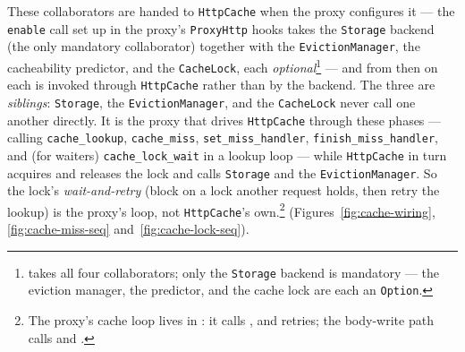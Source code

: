 These collaborators are handed to \texttt{HttpCache} when the proxy configures
it --- the \texttt{enable} call set up in the proxy's \texttt{ProxyHttp} hooks takes the
\texttt{Storage} backend (the only mandatory collaborator) together with the
\texttt{EvictionManager}, the cacheability predictor, and the \texttt{CacheLock}, each
\emph{optional}\footnote{
  takes all four collaborators; only the \texttt{Storage} backend is mandatory --- the
  eviction manager, the predictor, and the cache lock are each an \texttt{Option}.} --- and from
then on each is invoked through \texttt{HttpCache} rather than by the backend. The
three are \emph{siblings}: \texttt{Storage}, the \texttt{EvictionManager}, and the
\texttt{CacheLock} never call one another directly.
It is the proxy that drives \texttt{HttpCache} through these phases --- calling
\texttt{cache\_lookup}, \texttt{cache\_miss}, \texttt{set\_miss\_handler},
\texttt{finish\_miss\_handler}, and (for waiters) \texttt{cache\_lock\_wait} in a
lookup loop --- while \texttt{HttpCache} in turn acquires and releases the lock and
calls \texttt{Storage} and the \texttt{EvictionManager}. So the lock's
\emph{wait-and-retry} (block on a lock another request holds, then retry the lookup)
is the proxy's loop, not \texttt{HttpCache}'s own.\footnote{The proxy's cache loop
  lives in
  : it
  calls ,
   and
  retries; the body-write path calls
   and
  .}
(Figures~\ref{fig:cache-wiring}, \ref{fig:cache-miss-seq}
and~\ref{fig:cache-lock-seq}).

